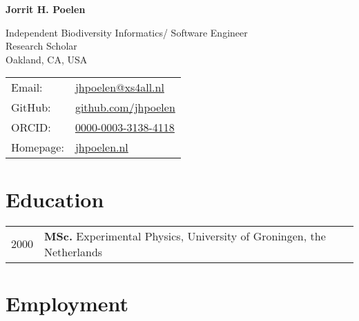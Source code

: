 \documentclass[11pt,fullpage]{article}
\def\name{Jorrit H. Poelen}
\begin{document}


\centerline{\Large \bf \name}

\vspace{0.25in}

\begin{minipage}{0.60\linewidth}
  Independent Biodiversity Informatics/ Software Engineer \\
  Research Scholar \\
  Oakland, CA, USA
\end{minipage}
\begin{minipage}{0.40\linewidth}
  \begin{tabular}{ll}
    Email: & \href{mailto:jhpoelen@xs4all.nl}{jhpoelen@xs4all.nl} \\
    GitHub: & \href{https://github.com/jhpoelen}{github.com/jhpoelen} \\
    ORCID: & \href{https://orcid.org/0000-0003-3138-4118}{0000-0003-3138-4118} \\
    Homepage: & \href{https://jhpoelen.nl}{jhpoelen.nl} \\
  \end{tabular}
\end{minipage}

\hrulefill

\section*{Education}

\begin{tabular}{ll}
	2000 & {\bf MSc.} Experimental Physics, University of Groningen, the Netherlands \\
\end{tabular}

\section*{Employment}

\end{document}
